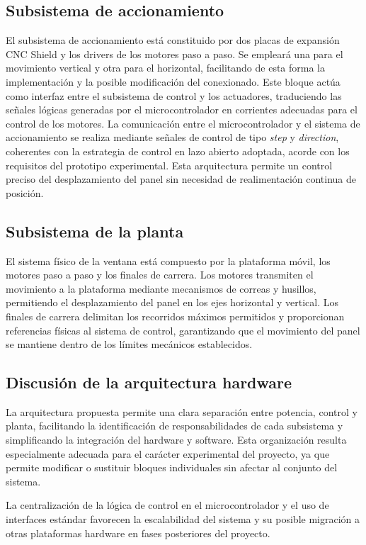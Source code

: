 \subsection{Subsistema de accionamiento}    
El subsistema de accionamiento está constituido por dos placas de expansión CNC Shield y los drivers de los motores paso a paso. Se empleará una para el movimiento vertical y otra para el horizontal, facilitando de esta forma la implementación y la posible modificación del conexionado. Este bloque actúa como interfaz entre el subsistema de control y los actuadores, traduciendo las señales lógicas generadas por el microcontrolador en corrientes adecuadas para el control de los motores. La comunicación entre el microcontrolador y el sistema de accionamiento se realiza mediante señales de control de tipo \textit{step} y \textit{direction}, coherentes con la estrategia de control en lazo abierto adoptada, acorde con los requisitos del prototipo experimental. Esta arquitectura permite un control preciso del desplazamiento del panel sin necesidad de realimentación continua de posición.


\subsection{Subsistema de la planta}
El sistema físico de la ventana está compuesto por la plataforma móvil, los motores paso a paso y los finales de carrera. Los motores transmiten el movimiento a la plataforma mediante mecanismos de correas y husillos, permitiendo el desplazamiento del panel en los ejes horizontal y vertical. Los finales de carrera delimitan los recorridos máximos permitidos y proporcionan referencias físicas al sistema de control, garantizando que el movimiento del panel se mantiene dentro de los límites mecánicos establecidos. 


\subsection{Discusión de la arquitectura hardware}
La arquitectura propuesta permite una clara separación entre potencia, control y planta, facilitando la identificación de responsabilidades de cada subsistema y simplificando la integración del hardware y software. Esta organización resulta especialmente adecuada para el carácter experimental del proyecto, ya que permite modificar o sustituir bloques individuales sin afectar al conjunto del sistema.

La centralización de la lógica de control en el microcontrolador y el uso de interfaces estándar favorecen la escalabilidad del sistema y su posible migración a otras plataformas hardware en fases posteriores del proyecto.

